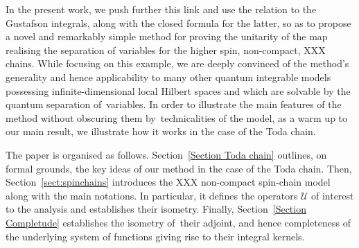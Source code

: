 In the present work, we push further this link and use the relation to the Gustafson integrals, along with the closed formula for the
latter, so as to propose a novel and remarkably simple method for proving the unitarity of the map realising the separation of variables
for the higher spin, non-compact, XXX chains. While focusing on this example, we are deeply convinced of the method's generality and hence
applicability to many other quantum integrable models possessing infinite-dimensional local Hilbert spaces and which are solvable by the
quantum separation of~variables. In order to illustrate the main features of the method without obscuring them by~technicalities of the
model, as a warm up to our main result, we illustrate how it works in the case of the Toda chain.


The paper is organised as follows. Section~\ref{Section Toda chain} outlines, on formal grounds, the key ideas of our method in the case of
the Toda chain. Then, Section~\ref{sect:spinchains} introduces the XXX non-compact spin-chain model along with the main notations. In
particular, it defines the operators $\mathcal{U}$ of interest to the analysis and establishes their isometry. Finally, Section~\ref{Section Completude} establishes the isometry of~their adjoint, and hence completeness of the underlying system of functions giving
rise to their integral kernels.
